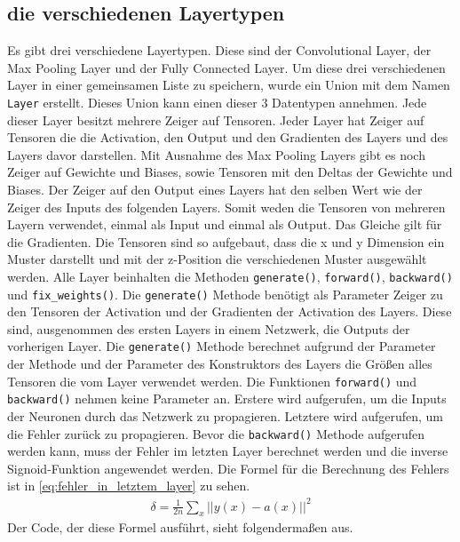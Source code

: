 \documentclass[../main.tex]{subfiles}
\begin{document}
\subsection{die verschiedenen Layertypen}
Es gibt drei verschiedene Layertypen. Diese sind der Convolutional Layer, der Max Pooling Layer und der Fully Connected Layer. Um diese drei verschiedenen Layer in einer gemeinsamen Liste zu speichern, wurde ein Union mit dem Namen \texttt{Layer} erstellt. Dieses Union kann einen dieser 3 Datentypen annehmen. 
Jede dieser Layer besitzt mehrere Zeiger auf Tensoren. Jeder Layer hat Zeiger auf Tensoren die die Activation, den Output und den Gradienten des Layers und des Layers davor darstellen. Mit Ausnahme des Max Pooling Layers gibt es noch Zeiger auf Gewichte und Biases, sowie Tensoren mit den Deltas der Gewichte und Biases. Der Zeiger auf den Output eines Layers hat den selben Wert wie der Zeiger des Inputs des folgenden Layers. Somit weden die Tensoren von mehreren Layern verwendet, einmal als Input und einmal als Output. Das Gleiche gilt für die Gradienten. Die Tensoren sind so aufgebaut, dass die x und y Dimension ein Muster darstellt und mit der z-Position die verschiedenen Muster ausgewählt werden.
Alle Layer beinhalten die Methoden \texttt{generate()}, \texttt{forward()}, \texttt{backward()} und \texttt{fix\_weights()}.
 Die \texttt{generate()} Methode benötigt als Parameter Zeiger zu den Tensoren der Activation und der Gradienten der Activation des Layers. Diese sind, ausgenommen des ersten Layers in einem Netzwerk, die Outputs der vorherigen Layer. Die \texttt{generate()} Methode berechnet aufgrund der Parameter der Methode und der Parameter des Konstruktors des Layers die Größen alles Tensoren die vom Layer verwendet werden.
Die Funktionen \texttt{forward()} und \texttt{backward()} nehmen keine Parameter an. Erstere wird aufgerufen, um die Inputs der Neuronen durch das Netzwerk zu propagieren. Letztere wird aufgerufen, um die Fehler zurück zu propagieren. 
Bevor die \texttt{backward()} Methode aufgerufen werden kann, muss der Fehler im letzten Layer berechnet werden und die inverse Signoid-Funktion angewendet werden. Die Formel für die Berechnung des Fehlers ist in \ref{eq:fehler_in_letztem_layer} zu sehen.
\begin{equation}\label{eq:fehler_in_letztem_layer}
\begin{split}
\delta = \frac{1}{2n} \sum_{x}^{} ||y(x)-a(x)||^{2}
\end{split}
\end{equation}
Der Code, der diese Formel ausführt, sieht folgendermaßen aus.
\end{document}
